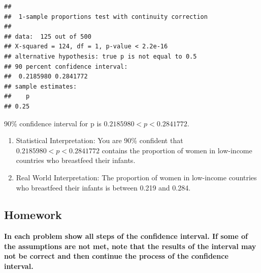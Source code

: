 \documentclass[]{book}
\begin{document}
\begin{verbatim}
## 
##  1-sample proportions test with continuity correction
## 
## data:  125 out of 500
## X-squared = 124, df = 1, p-value < 2.2e-16
## alternative hypothesis: true p is not equal to 0.5
## 90 percent confidence interval:
##  0.2185980 0.2841772
## sample estimates:
##    p 
## 0.25
\end{verbatim}

90\% confidence interval for p is \(0.2185980<p<0.2841772\).

\begin{enumerate}
\def\labelenumi{\arabic{enumi}.}
\setcounter{enumi}{3}
\item
  Statistical Interpretation: You are 90\% confident that \(0.2185980<p<0.2841772\) contains the proportion of women in low-income countries who breastfeed their infants.
\item
  Real World Interpretation: The proportion of women in low-income countries who breastfeed their infants is between 0.219 and 0.284.
\end{enumerate}

\hypertarget{homework-24}{%
\subsection{Homework}\label{homework-24}}

\textbf{In each problem show all steps of the confidence interval. If some of the assumptions are not met, note that the results of the interval may not be correct and then continue the process of the confidence interval.}
\end{document}

